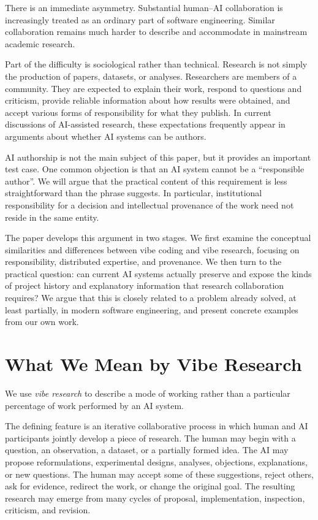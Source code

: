 There is an immediate asymmetry. Substantial human--AI collaboration is increasingly treated as an ordinary part of software engineering. Similar collaboration remains much harder to describe and accommodate in mainstream academic research.

Part of the difficulty is sociological rather than technical. Research is not simply the production of papers, datasets, or analyses. Researchers are members of a community. They are expected to explain their work, respond to questions and criticism, provide reliable information about how results were obtained, and accept various forms of responsibility for what they publish. In current discussions of AI-assisted research, these expectations frequently appear in arguments about whether AI systems can be authors.

AI authorship is not the main subject of this paper, but it provides an important test case. One common objection is that an AI system cannot be a ``responsible author''. We will argue that the practical content of this requirement is less straightforward than the phrase suggests. In particular, institutional responsibility for a decision and intellectual provenance of the work need not reside in the same entity.

The paper develops this argument in two stages. We first examine the conceptual similarities and differences between vibe coding and vibe research, focusing on responsibility, distributed expertise, and provenance. We then turn to the practical question: can current AI systems actually preserve and expose the kinds of project history and explanatory information that research collaboration requires? We argue that this is closely related to a problem already solved, at least partially, in modern software engineering, and present concrete examples from our own work.


\section{What We Mean by Vibe Research}

We use \emph{vibe research} to describe a mode of working rather than a particular percentage of work performed by an AI system.

The defining feature is an iterative collaborative process in which human and AI participants jointly develop a piece of research. The human may begin with a question, an observation, a dataset, or a partially formed idea. The AI may propose reformulations, experimental designs, analyses, objections, explanations, or new questions. The human may accept some of these suggestions, reject others, ask for evidence, redirect the work, or change the original goal. The resulting research may emerge from many cycles of proposal, implementation, inspection, criticism, and revision.

